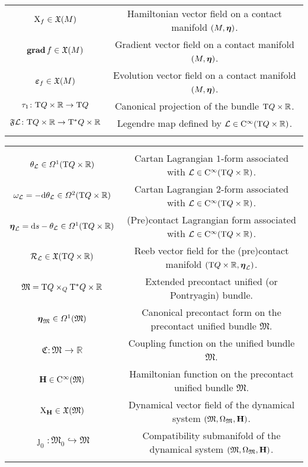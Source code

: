 \documentclass[12pt]{report}
\def\vf{\mathfrak X}
\def\df{{\mit\Omega}}
\def\Lag{{\cal L}}
\def\d{{\rm d}}
\def\Real{\mathbb{R}}
\def\bmeta{\mbox{\boldmath $\eta$}}
\def\evo{\mbox{\boldmath $\varepsilon$}}
\def\X{{\rm X}}
\def\Tan{{\rm T}}
\def\Cinfty{{\rm C}^\infty}
\newcommand{\Reeb}{\mathcal{R}}
\begin{document}
\begin{center}
{\begin{tabular}{|c|c|}
$\X_f\in\vf(M)$ & Hamiltonian vector field on a contact manifold $(M,\bmeta)$. \\
${\bf grad}\,f\in\vf(M)$ & Gradient vector field on a contact manifold $(M,\bmeta)$. \\
$\evo_f\in\vf(M)$ & Evolution vector field on a contact manifold $(M,\bmeta)$. \\
$\tau_1\colon\Tan Q\times\Real\rightarrow\Tan Q$ & 
Canonical projection of the bundle $\Tan Q\times\Real$. \\
 $\mathfrak{F}\Lag\colon\Tan Q\times\Real\to\Tan^*Q\times\Real$ &
 Legendre map defined by $\Lag\in\Cinfty(\Tan Q\times\Real)$. \\
 & \\
\hline
\end{tabular}
}
\end{center}

\begin{center}
{\small
\begin{tabular}{|c|c|}
\hline
 & \\
 $\theta_\Lag\in\df^1(\Tan Q\times\Real)$ &
Cartan Lagrangian $1$-form associated with $\Lag\in\Cinfty(\Tan Q\times\Real)$. \\
$\omega_\Lag=-\d\theta_\Lag\in\df^2(\Tan Q\times\Real)$ &
Cartan Lagrangian $2$-form associated with $\Lag\in\Cinfty(\Tan Q\times\Real)$. \\
 $\bmeta_\Lag=\d s-\theta_\Lag\in\df^1(\Tan Q\times\Real)$ &
(Pre)contact Lagrangian form associated with $\Lag\in\Cinfty(\Tan Q\times\Real)$. \\
$\Reeb_\Lag\in\vf(\Tan Q\times\Real)$ &
Reeb vector field for the (pre)contact manifold 
$(\Tan Q\times\Real,\bmeta_\Lag)$. \\
 $\mathfrak{M}=\Tan Q\times_Q\Tan^*Q\times\Real$ &
Extended precontact unified (or Pontryagin) bundle. \\ 
$\bmeta_{\mathfrak{M}}\in\df^1(\mathfrak{M})$ &
Canonical precontact form on the precontact unified bundle $\mathfrak{M}$. 
\\ 
$\mathfrak{C}\colon\mathfrak{M}\to\Real$ &
Coupling function on the unified bundle $\mathfrak{M}$. \\
${\bf H}\in\Cinfty(\mathfrak{M})$ &
Hamiltonian function on the precontact unified bundle $\mathfrak{M}$.\\
$\X_{\bf H}\in\vf(\mathfrak{M})$ &
Dynamical vector field of the dynamical system $(\mathfrak{M},\Omega_\mathfrak{M},{\bf H})$. \\
$\jmath_0\colon\mathfrak{M}_0\hookrightarrow\mathfrak{M}$ &
Compatibility submanifold of the dynamical system $(\mathfrak{M},\Omega_\mathfrak{M}
,{\bf H})$. \\
  & \\
\hline
\end{tabular}
}
\end{center}
\end{document}
